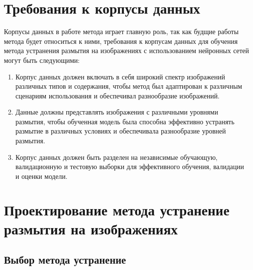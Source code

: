 

\section{Требования к корпусы данных}

Корпусы данных в работе метода играет главную роль, так как будщие работы метода будет относиться к ними, требования к корпусам данных для обучения метода устранения размытия на изображениях с использованием нейронных сетей могут быть следующими:

\begin{enumerate}[left=0.49cm]
    \item Корпус данных должен включать в себя широкий спектр изображений различных типов и содержания, чтобы метод был адаптирован к различным сценариям использования и обеспечивал разнообразие изображений.

    \item Данные должны представлять изображения с различными уровнями размытия, чтобы обученная модель была способна эффективно устранять размытие в различных условиях и обеспечивала разнообразие уровней размытия.


    \item Корпус данных должен быть разделен на независимые обучающую, валидационную и тестовую выборки для эффективного обучения, валидации и оценки модели.
\end{enumerate}

\section{Проектирование метода устранение размытия на изображениях}

\subsection{Выбор метода устранение}

